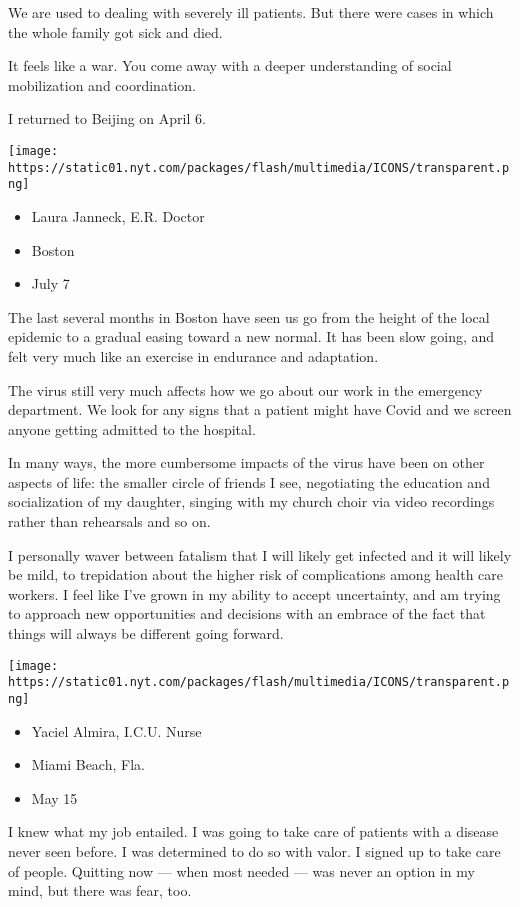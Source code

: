We are used to dealing with severely ill patients. But there were cases
in which the whole family got sick and died.

It feels like a war. You come away with a deeper understanding of social
mobilization and coordination.

I returned to Beijing on April 6.

\texttt{[image: https://static01.nyt.com/packages/flash/multimedia/ICONS/transparent.png]}

\begin{itemize}
\tightlist
\item
  Laura Janneck, E.R. Doctor
\item
  Boston
\item
  July 7
\end{itemize}

The last several months in Boston have seen us go from the height of the
local epidemic to a gradual easing toward a new normal. It has been slow
going, and felt very much like an exercise in endurance and adaptation.

The virus still very much affects how we go about our work in the
emergency department. We look for any signs that a patient might have
Covid and we screen anyone getting admitted to the hospital.

In many ways, the more cumbersome impacts of the virus have been on
other aspects of life: the smaller circle of friends I see, negotiating
the education and socialization of my daughter, singing with my church
choir via video recordings rather than rehearsals and so on.

I personally waver between fatalism that I will likely get infected and
it will likely be mild, to trepidation about the higher risk of
complications among health care workers. I feel like I've grown in my
ability to accept uncertainty, and am trying to approach new
opportunities and decisions with an embrace of the fact that things will
always be different going forward.

\texttt{[image: https://static01.nyt.com/packages/flash/multimedia/ICONS/transparent.png]}

\begin{itemize}
\tightlist
\item
  Yaciel Almira, I.C.U. Nurse
\item
  Miami Beach, Fla.
\item
  May 15
\end{itemize}

I knew what my job entailed. I was going to take care of patients with a
disease never seen before. I was determined to do so with valor. I
signed up to take care of people. Quitting now --- when most needed ---
was never an option in my mind, but there was fear, too.

